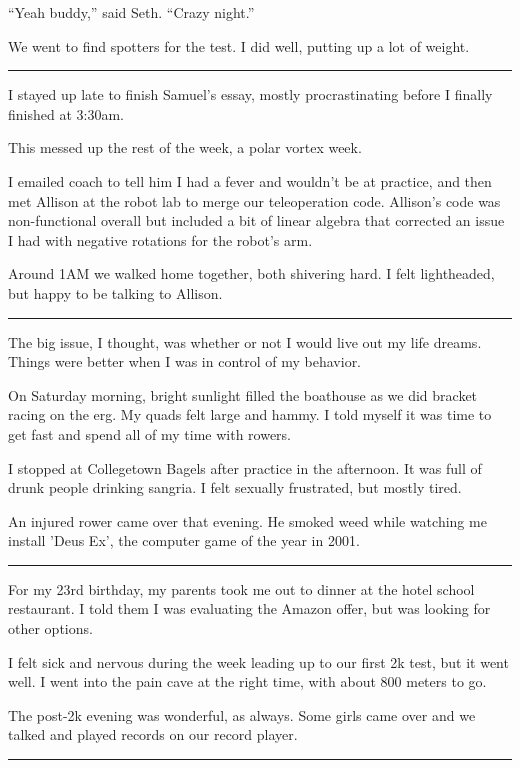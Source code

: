 ``Yeah buddy,'' said Seth.  ``Crazy night.'' 

We went to find spotters for the test.  I did well, putting up a lot of weight.

\plainfancybreak{12pt}{2}{}

I stayed up late to finish Samuel's essay, mostly procrastinating before I
finally finished at 3:30am.

This messed up the rest of the week, a polar vortex week.

I emailed coach to tell him I had a fever and wouldn't be at practice, and then
met Allison at the robot lab to merge our teleoperation code.   Allison's code
was non-functional overall but included a bit of linear algebra that corrected
an issue I had with negative rotations for the robot's arm.

Around 1AM we walked home together, both shivering hard.  I felt lightheaded,
but happy to be talking to Allison. 

\plainfancybreak{12pt}{2}{}

The big issue, I thought, was whether or not I would live out my life dreams.
Things were better when I was in control of my behavior.  

On Saturday morning, bright sunlight filled the boathouse as we did bracket
racing on the erg.  My quads felt large and hammy.  I told myself it was time to
get fast and spend all of my time with rowers.

I stopped at Collegetown Bagels after practice in the afternoon.  It was full of
drunk people drinking sangria.  I felt sexually frustrated, but mostly tired.  

An injured rower came over that evening.  He smoked weed while watching me
install 'Deus Ex', the computer game of the year in 2001. 

\plainfancybreak{12pt}{2}{}

For my 23rd birthday, my parents took me out to dinner at the hotel school
restaurant.  I told them I was evaluating the Amazon offer, but was looking for
other options.

I felt sick and nervous during the week leading up to our first 2k test, but it
went well.  I went into the pain cave at the right time, with about 800 meters
to go.  

The post-2k evening was wonderful, as always.  Some girls came over and we
talked and played records on our record player.  

\plainfancybreak{12pt}{2}{}

